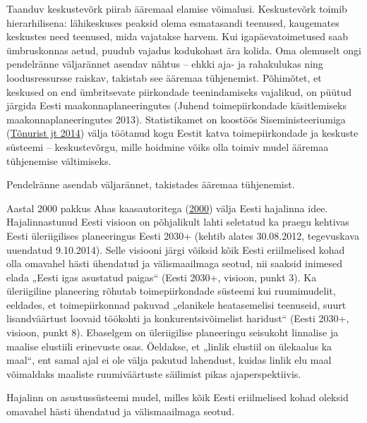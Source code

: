\documentclass[estonian,]{article}
\begin{document}
Taanduv keskustevõrk piirab ääremaal elamise võimalusi. Keskustevõrk toimib hierarhilisena: lähikeskuses peaksid olema esmatasandi teenused, kaugemates keskustes need teenused, mida vajatakse harvem. Kui igapäevatoimetused saab ümbruskonnas aetud, puudub vajadus kodukohast ära kolida. Oma olemuselt ongi pendelränne väljarännet asendav nähtus -- ehkki aja- ja rahakulukas ning loodusressursse raiskav, takistab see ääremaa tühjenemist. Põhimõtet, et keskused on end ümbritsevate piirkondade teenindamiseks vajalikud, on püütud järgida Eesti maakonnaplaneeringutes (Juhend toimepiirkondade käsitlemiseks maakonnaplaneeringutes 2013). Statistikamet on koostöös Siseministeeriumiga (\protect\hyperlink{Tuxf5nurist2014}{Tõnurist jt 2014}) välja töötanud kogu Eestit katva toimepiirkondade ja keskuste süsteemi -- keskustevõrgu, mille hoidmine võiks olla toimiv mudel ääremaa tühjenemise vältimiseks.

\begin{blockquote-left}
Pendelränne asendab väljarännet, takistades ääremaa tühjenemist.
\end{blockquote-left}

Aastal 2000 pakkus Ahas kaasautoritega (\protect\hyperlink{Ahas2000}{2000}) välja Eesti hajalinna idee. Hajalinnastunud Eesti visioon on põhjalikult lahti seletatud ka praegu kehtivas Eesti üleriigilises planeeringus Eesti 2030+ (kehtib alates 30.08.2012, tegevuskava uuendatud 9.10.2014). Selle visiooni järgi võiksid kõik Eesti eriilmelised kohad olla omavahel hästi ühendatud ja välismaailmaga seotud, nii saaksid inimesed elada „Eesti igas asustatud paigas`` (Eesti 2030+, visioon, punkt 3). Ka üleriigiline planeering rõhutab toimepiirkondade süsteemi kui ruumimudelit, eeldades, et toimepiirkonnad pakuvad „elanikele heatasemelisi teenuseid, suurt lisandväärtust loovaid töökohti ja konkurentsivõimelist haridust`` (Eesti 2030+, visioon, punkt 8). Ebaselgem on üleriigilise planeeringu seisukoht linnalise ja maalise elustiili erinevuste osas. Öeldakse, et „linlik elustiil on ülekaalus ka maal``, ent samal ajal ei ole välja pakutud lahendust, kuidas linlik elu maal võimaldaks maaliste ruumiväärtuste säilimist pikas ajaperspektiivis.

\begin{blockquote-right}
Hajalinn on asustussüsteemi mudel, milles kõik Eesti eriilmelised kohad
oleksid omavahel hästi ühendatud ja välismaailmaga seotud.
\end{blockquote-right}
\end{document}
